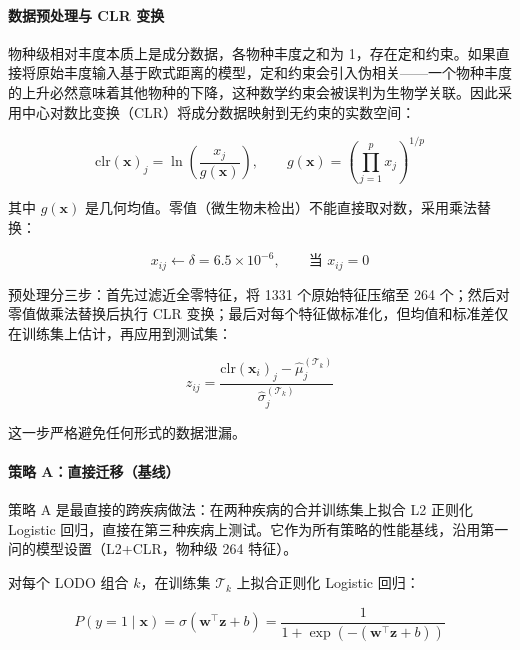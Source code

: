 \documentclass{../../latex/templates/mcm-paper}
\begin{document}
\paragraph{数据预处理与 CLR 变换}

物种级相对丰度本质上是成分数据，各物种丰度之和为 1，存在定和约束。如果直接将原始丰度输入基于欧式距离的模型，定和约束会引入伪相关——一个物种丰度的上升必然意味着其他物种的下降，这种数学约束会被误判为生物学关联。因此采用中心对数比变换（CLR）将成分数据映射到无约束的实数空间：

\begin{equation}
\mathrm{clr}(\mathbf{x})_j = \ln\!\left(\frac{x_j}{g(\mathbf{x})}\right), \qquad g(\mathbf{x}) = \left(\prod_{j=1}^{p} x_j\right)^{1/p}
\label{eq:s3-clr}
\end{equation}

其中 $g(\mathbf{x})$ 是几何均值。零值（微生物未检出）不能直接取对数，采用乘法替换：

\begin{equation}
x_{ij} \leftarrow \delta = 6.5\times10^{-6}, \qquad \text{当 } x_{ij}=0
\label{eq:s3-zeroreplace}
\end{equation}

预处理分三步：首先过滤近全零特征，将 1331 个原始特征压缩至 264 个；然后对零值做乘法替换后执行 CLR 变换；最后对每个特征做标准化，但均值和标准差仅在训练集上估计，再应用到测试集：

\begin{equation}
z_{ij} = \frac{\mathrm{clr}(\mathbf{x}_i)_j - \hat{\mu}_j^{(\mathcal{T}_k)}}{\hat{\sigma}_j^{(\mathcal{T}_k)}}
\label{eq:s3-scaler}
\end{equation}

这一步严格避免任何形式的数据泄漏。

\paragraph{策略 A：直接迁移（基线）}

策略 A 是最直接的跨疾病做法：在两种疾病的合并训练集上拟合 L2 正则化 Logistic 回归，直接在第三种疾病上测试。它作为所有策略的性能基线，沿用第一问的模型设置（L2+CLR，物种级 264 特征）。

对每个 LODO 组合 $k$，在训练集 $\mathcal{T}_k$ 上拟合正则化 Logistic 回归：

\begin{equation}
P(y=1 \mid \mathbf{x}) = \sigma\!\left(\mathbf{w}^{\top}\mathbf{z} + b\right) = \frac{1}{1+\exp\!\left(-\left(\mathbf{w}^{\top}\mathbf{z}+b\right)\right)}
\label{eq:s3-logistic}
\end{equation}
\end{document}
